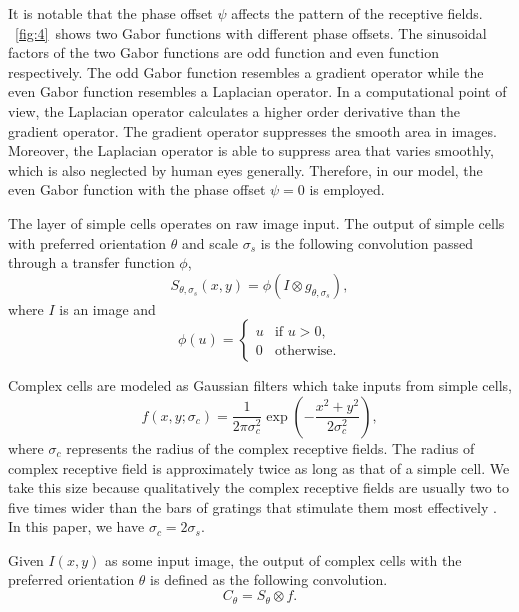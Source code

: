 \documentclass[9pt,twocolumn]{article}
\begin{document}
It is notable that the phase offset $\psi$ affects the pattern of the receptive fields.
\figurename~\ref{fig:4}~shows two Gabor functions with different phase offsets.
The sinusoidal factors of the two Gabor functions are odd function and even function respectively.
The odd Gabor function resembles a gradient operator while the even Gabor function resembles a Laplacian operator.
In a computational point of view, the Laplacian operator calculates a higher order derivative than the gradient operator.
The gradient operator suppresses the smooth area in images.
Moreover, the Laplacian operator is able to suppress area that varies smoothly, which is also neglected by human eyes generally.
Therefore, in our model, the even Gabor function with the phase offset $\psi=0$ is employed.

The layer of simple cells operates on raw image input. 
The output of simple cells with preferred orientation $\theta$ and scale $\sigma_s$ is the following convolution passed through a transfer function $\phi$,
\begin{equation}\label{equ:gabor}
S_{\theta,\sigma_s}(x,y)=\phi(I\otimes g_{\theta,\sigma_s}),
\end{equation}
where $I$ is an image and 
\begin{equation}\label{equ:gabor}
\phi(u)=\left\{\begin{array}{ll}
u & \text{if } u>0,\\
0 & \text{otherwise.}
\end{array}\right.
\end{equation}

Complex cells are modeled as Gaussian filters which take inputs from simple cells,
\begin{equation}
f(x,y;\sigma_c)=\frac{1}{2\pi\sigma_c^2}\exp\left(-\frac{x^2+y^2}{2\sigma_c^2}\right),
\end{equation}
where $\sigma_c$ represents the radius of the complex receptive fields.
The radius of complex receptive field is approximately twice as long as that of a simple cell.
We take this size because qualitatively the complex receptive fields are usually two to five times wider 
than the bars of gratings that stimulate them most effectively \cite{hubel1962}.
In this paper, we have $\sigma_c=2\sigma_s$.

Given $I(x,y)$ as some input image, the output of complex cells
with the preferred orientation $\theta$ is defined as the following convolution.
\begin{equation}
C_{\theta}=S_{\theta}\otimes f.
\label{equ:complex}
\end{equation}
\end{document}
